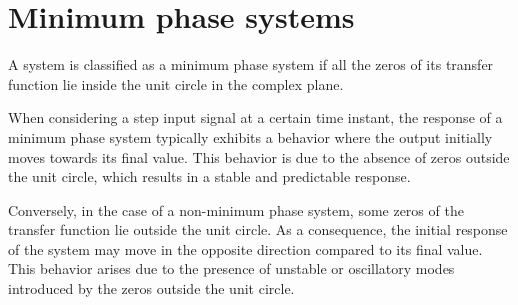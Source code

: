 \section{Minimum phase systems}

\begin{definition}
    A system is classified as a minimum phase system if all the zeros of its transfer function lie inside the unit circle in the complex plane.
\end{definition}
When considering a step input signal at a certain time instant, the response of a minimum phase system typically exhibits a behavior where the output initially moves towards its final value. 
This behavior is due to the absence of zeros outside the unit circle, which results in a stable and predictable response.

Conversely, in the case of a non-minimum phase system, some zeros of the transfer function lie outside the unit circle. 
As a consequence, the initial response of the system may move in the opposite direction compared to its final value. 
This behavior arises due to the presence of unstable or oscillatory modes introduced by the zeros outside the unit circle.

